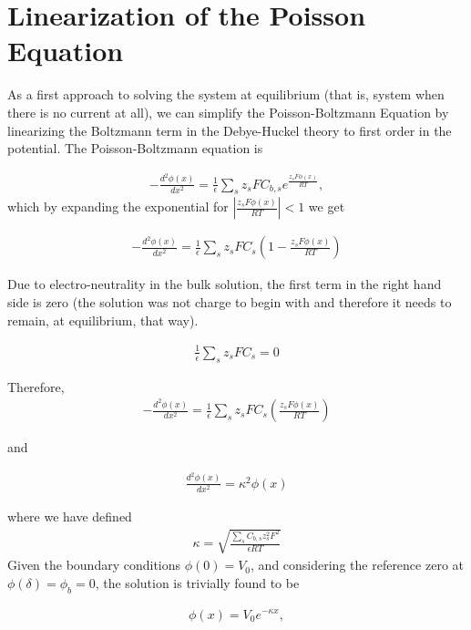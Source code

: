 \label{ch:2}
\section{Linearization of the Poisson Equation}

As a first approach to solving the system at equilibrium (that is, system when there is no current at all), we can simplify the Poisson-Boltzmann Equation by linearizing the Boltzmann term in the Debye-Huckel theory to first order in the potential.
The Poisson-Boltzmann equation is

\begin{align}
\label{eq:system0}
-\frac{d^2\phi(x)}{dx^2}  =\frac{1}{\epsilon}\sum_s z_s F C_{b,s} e^{\frac{z_s F \phi(x)}{RT}},
\end{align}
which by expanding the exponential for $\left|\frac{z_s F \phi(x)}{RT}\right| < 1$ we get

\begin{align}
	-\frac{d^2\phi(x)}{dx^2} =\frac{1}{\epsilon}\sum_s z_s F C_s \left(1-\frac{z_s F \phi(x)}{RT}\right)
\end{align}

Due to electro-neutrality in the bulk solution, the first term in the right hand side is zero (the solution was not charge to begin with and therefore it needs to remain, at equilibrium, that way). 

\begin{align}
	\frac{1}{\epsilon}\sum_s z_s F C_s  = 0	
\end{align}


Therefore, 
\begin{align}
	-\frac{d^2\phi(x)}{dx^2} =\frac{1}{\epsilon}\sum_s z_s F C_s \left(\frac{z_s F \phi(x)}{RT}\right)	
\end{align}


and

\begin{align}
	\frac{d^2\phi(x)}{dx^2} =\kappa^2 \phi(x)
\end{align}

where we have defined 
\begin{align}
	\kappa = \sqrt{\frac{\sum_s C_{b,s} z_s^2 F^2}{\epsilon RT}}
\end{align}
Given the boundary conditions $\phi(0) = V_0$, and considering the reference zero at $\phi(\delta) = \phi_b = 0$, the solution is trivially found to be

\begin{align}
	\phi(x) = V_0 e^{-\kappa x},
\end{align}
	

